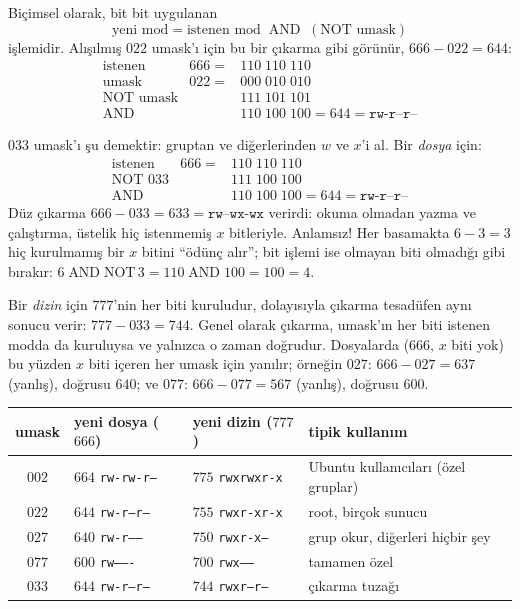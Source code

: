 Biçimsel olarak, bit bit uygulanan
\[
\text{yeni mod} = \text{istenen mod} \;\mathbin{\text{AND}}\; (\text{NOT umask})
\]
işlemidir. Alışılmış $022$ umask'ı için bu bir çıkarma gibi görünür, $666 - 022 = 644$:
\[
\begin{array}{lrl}
\text{istenen} & 666 = & 110\;110\;110 \\
\text{umask}     & 022 = & 000\;010\;010 \\
\text{NOT umask} &       & 111\;101\;101 \\ \hline
\text{AND}       &       & 110\;100\;100 = 644 = \texttt{rw-r--r--}
\end{array}
\]

\begin{example}
$033$ umask'ı şu demektir: gruptan ve diğerlerinden $w$ ve $x$'i al. Bir \emph{dosya} için:
\[
\begin{array}{lrl}
\text{istenen} & 666 = & 110\;110\;110 \\
\text{NOT } 033  &       & 111\;100\;100 \\ \hline
\text{AND}       &       & 110\;100\;100 = 644 = \texttt{rw-r--r--}
\end{array}
\]
Düz çıkarma $666 - 033 = 633 = \texttt{rw--wx-wx}$ verirdi: okuma olmadan yazma ve çalıştırma, üstelik hiç istenmemiş $x$ bitleriyle. Anlamsız! Her basamakta $6 - 3 = 3$ hiç kurulmamış bir $x$ bitini ``ödünç alır''; bit işlemi ise olmayan biti olmadığı gibi bırakır: $6 \mathbin{\text{AND}} \text{NOT}\,3 = 110 \mathbin{\text{AND}} 100 = 100 = 4$.

Bir \emph{dizin} için $777$'nin her biti kuruludur, dolayısıyla çıkarma tesadüfen aynı sonucu verir: $777 - 033 = 744$. Genel olarak çıkarma, umask'ın her biti istenen modda da kuruluysa ve yalnızca o zaman doğrudur. Dosyalarda ($666$, $x$ biti yok) bu yüzden $x$ biti içeren her umask için yanılır; örneğin $027$: $666 - 027 = 637$ (yanlış), doğrusu $640$; ve $077$: $666 - 077 = 567$ (yanlış), doğrusu $600$.
\end{example}

\begin{center}
\small
\begin{tabular}{@{}c l l l@{}}
\toprule
\textbf{umask} & \textbf{yeni dosya} ($666$) & \textbf{yeni dizin} ($777$) & \textbf{tipik kullanım} \\
\midrule
$002$ & $664$ \texttt{rw-rw-r--} & $775$ \texttt{rwxrwxr-x} & Ubuntu kullanıcıları (özel gruplar) \\
$022$ & $644$ \texttt{rw-r--r--} & $755$ \texttt{rwxr-xr-x} & root, birçok sunucu \\
$027$ & $640$ \texttt{rw-r-----} & $750$ \texttt{rwxr-x---} & grup okur, diğerleri hiçbir şey \\
$077$ & $600$ \texttt{rw-------} & $700$ \texttt{rwx------} & tamamen özel \\
$033$ & $644$ \texttt{rw-r--r--} & $744$ \texttt{rwxr--r--} & çıkarma tuzağı \\
\bottomrule
\end{tabular}
\end{center}

